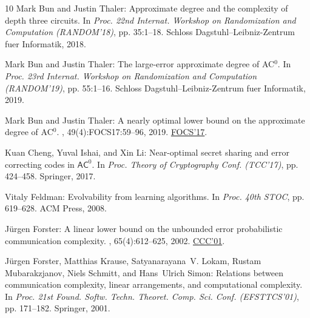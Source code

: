 \documentclass[11pt]{article}
\numberwithin{equation}{section}
\theoremstyle{definition}
\theoremstyle{plain}
\begin{document}
\begin{thebibliography}{10}
{\sc Mark Bun and Justin Thaler}: Approximate degree and the complexity of
  depth three circuits.
\newblock In {\em Proc. 22nd Internat. Workshop on Randomization and
  Computation (RANDOM'18)}, pp. 35:1--18. Schloss Dagstuhl--Leibniz-Zentrum
  fuer Informatik, 2018.

{\sc Mark Bun and Justin Thaler}: The large-error approximate degree of
  {AC}$^0$.
\newblock In {\em Proc. 23rd Internat. Workshop on Randomization and
  Computation (RANDOM'19)}, pp. 55:1--16. Schloss Dagstuhl--Leibniz-Zentrum
  fuer Informatik, 2019.

{\sc Mark Bun and Justin Thaler}: A nearly optimal lower bound on the
  approximate degree of {AC}$^0$.
, 49(4):FOCS17:59--96, 2019.
\newblock \prelim \href{https://doi.org/10.1109/FOCS.2017.10}{FOCS'17}.
\newblock [\epfmtdoi{10.1137/17M1161737}]

{\sc Kuan Cheng, Yuval Ishai, and Xin Li}: Near-optimal secret sharing and
  error correcting codes in $\mathsf{AC}^0$.
\newblock In {\em Proc. Theory of Cryptography Conf. (TCC'17)}, pp. 424--458.
  Springer, 2017.
\newblock [\epfmtdoi{10.1007/978-3-319-70503-3\_14}]

{\sc Vitaly Feldman}: Evolvability from learning algorithms.
\newblock In {\em Proc. 40th STOC}, pp. 619--628. ACM Press, 2008.
\newblock [\epfmtdoi{10.1145/1374376.1374465}]

{\sc J{\"{u}}rgen Forster}: A linear lower bound on the unbounded error
  probabilistic communication complexity.
, 65(4):612--625, 2002.
\newblock \prelim \href{https://doi.org/10.1109/CCC.2001.933877}{CCC'01}.
\newblock [\epfmtdoi{10.1016/S0022-0000(02)00019-3}]

{\sc J{\"{u}}rgen Forster, Matthias Krause, Satyanarayana~V. Lokam, Rustam
  Mubarakzjanov, Niels Schmitt, and Hans~Ulrich Simon}: Relations between
  communication complexity, linear arrangements, and computational complexity.
\newblock In {\em Proc. 21st Found. Softw. Techn. Theoret. Comp. Sci. Conf.
  (EFSTTCS'01)}, pp. 171--182. Springer, 2001.
\newblock [\epfmtdoi{10.1007/3-540-45294-X\_15}]


\end{thebibliography}
\end{document}

